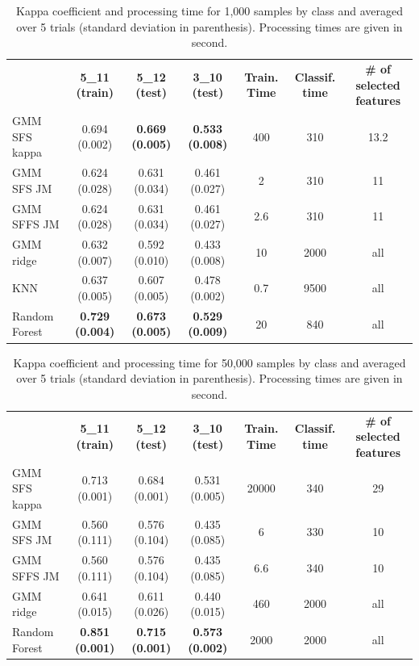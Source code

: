 \documentclass[journal]{IEEEtran}
\begin{document}
    \begin{table}[!t]
        \centering
        \caption{Kappa coefficient and processing time for 1,000 samples by class and averaged over 5 trials (standard deviation in parenthesis). Processing times are given in second.\label{tab:potsdam-otbsimu}}
        \begin{tabular}{lcccccc}\toprule
            & {\bfseries 5\_11 (train)} & {\bfseries 5\_12 (test)} & {\bfseries 3\_10 (test)} & {\bfseries Train. Time} & {\bfseries Classif. time} & {\bfseries \# of selected features} \\ \cmidrule{2-7}
            GMM SFS kappa & 0.694 (0.002)             & {\bfseries 0.669 (0.005)} & {\bfseries 0.533 (0.008)} & 400 & 310  & 13.2 \\
            GMM SFS JM &    0.624 (0.028)             & 0.631 (0.034)             & 0.461 (0.027)             & 2   & 310  & 11 \\
            GMM SFFS JM &   0.624 (0.028)             & 0.631 (0.034)             & 0.461 (0.027)             & 2.6 & 310  & 11 \\
            GMM ridge &     0.632 (0.007)             & 0.592 (0.010)             & 0.433 (0.008)             & 10  & 2000 & all \\
            KNN &           0.637 (0.005)             & 0.607 (0.005)             & 0.478 (0.002)             & 0.7 & 9500 & all \\
            Random Forest & {\bfseries 0.729 (0.004)} & {\bfseries 0.673 (0.005)} & {\bfseries 0.529 (0.009)} & 20  & 840  & all \\
            \bottomrule
        \end{tabular}
    \end{table}

    \begin{table}[!t]
        \centering
        \caption{Kappa coefficient and processing time for 50,000 samples by class and averaged over 5 trials (standard deviation in parenthesis). Processing times are given in second.\label{tab:potsdam-otbsimu-big}}
        \begin{tabular}{lcccccc}\toprule
            & {\bfseries 5\_11 (train)} & {\bfseries 5\_12 (test)} & {\bfseries 3\_10 (test)} & {\bfseries Train. Time} & {\bfseries Classif. time} & {\bfseries \# of selected features} \\ \cmidrule{2-7}
            GMM SFS kappa & 0.713 (0.001) & 0.684 (0.001) & 0.531 (0.005) & 20000 & 340 & 29 \\
            GMM SFS JM &    0.560 (0.111) & 0.576 (0.104) & 0.435 (0.085) & 6 & 330 & 10 \\
            GMM SFFS JM &   0.560 (0.111) & 0.576 (0.104) & 0.435 (0.085) & 6.6 & 340 & 10 \\
            GMM ridge &     0.641 (0.015) & 0.611 (0.026) & 0.440 (0.015) & 460 & 2000 & all \\
            Random Forest & {\bfseries 0.851 (0.001)} & {\bfseries 0.715 (0.001)} & {\bfseries 0.573 (0.002)} & 2000 & 2000 & all \\
            \bottomrule
        \end{tabular}
    \end{table}
\end{document}
